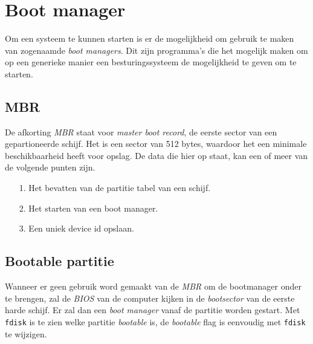 %
%
%
%

\chapter{Boot manager}\label{app.grub}
Om een systeem te kunnen starten is er de mogelijkheid om gebruik te maken van zogenaamde \emph{boot managers}. Dit zijn programma's die het mogelijk maken om op een generieke manier een besturingssysteem de mogelijkheid te geven om te starten. 

\section{MBR}
De afkorting \emph{MBR} staat voor \emph{master boot record}, de eerste sector van een gepartioneerde schijf. Het is een sector van 512 bytes, waardoor het een minimale beschikbaarheid heeft voor opslag. De data die hier op staat, kan een of meer van de volgende punten zijn.
\begin{itemize}
\item[1.] Het bevatten van de partitie tabel van een schijf. 
\item[2.] Het starten van een boot manager.
\item[3.] Een uniek device id opslaan. 
\end{itemize}

\section{Bootable partitie}
Wanneer er geen gebruik word gemaakt van de \emph{MBR} om de bootmanager onder te brengen, zal de \emph{BIOS} van de computer kijken in de \emph{bootsector} van de eerste harde schijf. Er zal dan een \emph{boot manager} vanaf de partitie worden gestart. Met \texttt{fdisk} is te zien welke partitie \emph{bootable} is, de \emph{bootable} flag is eenvoudig met \texttt{fdisk} te wijzigen.

